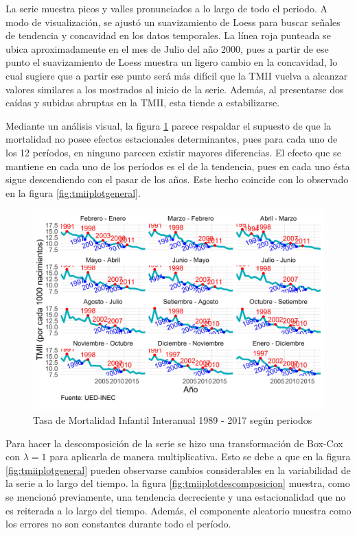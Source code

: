 \documentclass[
]{article}
\begin{document}
La serie muestra picos y valles pronunciados a lo largo de todo el
periodo. A modo de visualización, se ajustó un suavizamiento de Loess
para buscar señales de tendencia y concavidad en los datos temporales.
La línea roja punteada se ubica aproximadamente en el mes de Julio del
año 2000, pues a partir de ese punto el suavizamiento de Loess muestra
un ligero cambio en la concavidad, lo cual sugiere que a partir ese
punto será más difícil que la TMII vuelva a alcanzar valores similares a
los mostrados al inicio de la serie. Además, al presentarse dos caídas y
subidas abruptas en la TMII, esta tiende a estabilizarse.

Mediante un análisis visual, la figura \ref{fig:tmiiplotperiodos} parece
respaldar el supuesto de que la mortalidad no posee efectos estacionales
determinantes, pues para cada uno de los 12 períodos, en ninguno parecen
existir mayores diferencias. El efecto que se mantiene en cada uno de
los períodos es el de la tendencia, pues en cada uno ésta sigue
descendiendo con el pasar de los años. Este hecho coincide con lo
observado en la figura \ref{fig:tmiiplotgeneral}.

\begin{figure}[H]
\includegraphics[width=1\linewidth,height=1\textheight]{Tesis_files/figure-latex/tmiiplotperiodos-1} \caption{Tasa de Mortalidad Infantil Interanual 1989 - 2017 según periodos}\label{fig:tmiiplotperiodos}
\end{figure}

Para hacer la descomposición de la serie se hizo una transformación de
Box-Cox con \(\lambda=1\) para aplicarla de manera multiplicativa. Esto
se debe a que en la figura \ref{fig:tmiiplotgeneral} pueden observarse
cambios considerables en la variabilidad de la serie a lo largo del
tiempo. la figura \ref{fig:tmiiplotdescomposicion} muestra, como se
mencionó previamente, una tendencia decreciente y una estacionalidad que
no es reiterada a lo largo del tiempo. Además, el componente aleatorio
muestra como los errores no son constantes durante todo el período.
\end{document}
